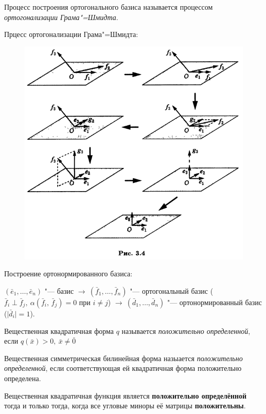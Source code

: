 \begin{definition}
  Процесс построения ортогонального базиса называется процессом \textit{ортогонализации Грама"=Шмидта}.
\end{definition}
\begin{example}
  Прцесс ортогонализации Грама"=Шмидта:
  \begin{figure}[H]
    \centering
    \includegraphics[width= \textwidth]{images/map_form_gram-shmidt.png}
  \end{figure}
\end{example}
Построение ортонормированного базиса:

$(\bar{e}_1, \ldots, \bar{e}_n)$ "--- базис $\rightarrow ~ (\bar{f}_1, \ldots, \bar{f}_n)$ "--- ортогональный базис ($\bar{f}_i \; \bot \; \bar{f}_j, ~ \alpha(\bar{f}_i, \, \bar{f}_j) = 0$ при $i \neq j$) $\rightarrow ~ (\bar{d}_1, \ldots, \bar{d}_n)$ "--- ортонормированный базис ($\mathopen| \bar{d}_i \mathclose| = 1$).

\begin{definition}
  Вещественная квадратичная форма $q$ называется \textit{положительно определенной}, если $q(\bar{x}) > 0,~ \bar{x} \neq \bar{0}$

  Вещественная симметрическая билинейная форма назыается \textit{положительно определенной}, если соответствующая ей квадратичная форма положительно определена.
\end{definition}
\begin{theorem}
  Вещественная квадратичная функция является \textbf{положительно определённой} тогда и только тогда, когда все угловые миноры её матрицы \textbf{положительны}.
\end{theorem}
